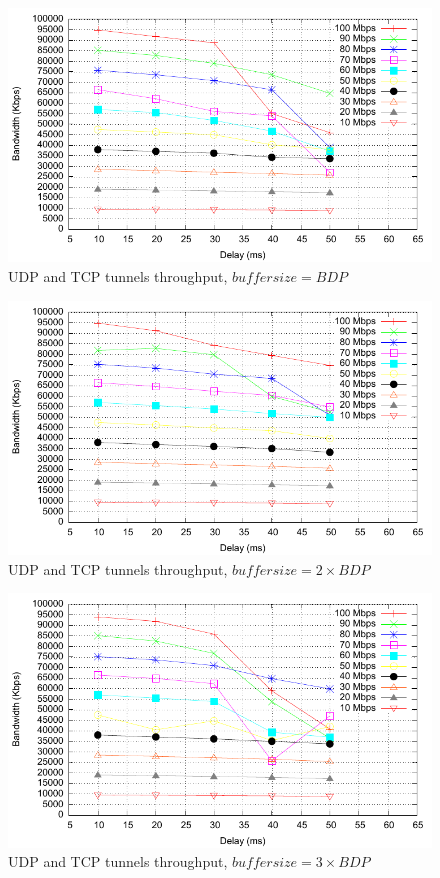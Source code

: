 \begin{figure}
  \centering
  \includegraphics[width=\textwidth]{img/test-mptcp}
  \caption{UDP and TCP tunnels throughput, $buffer size = BDP$}
  \label{fig:mptcp}
\end{figure}

\begin{figure}
  \centering
  \includegraphics[width=\textwidth]{img/test-mptcp-2}
  \caption{UDP and TCP tunnels throughput, $buffer size = 2 \times BDP$}
  \label{fig:mptcp-2}
\end{figure}

\begin{figure}
  \centering
  \includegraphics[width=\textwidth]{img/test-mptcp-3}
  \caption{UDP and TCP tunnels throughput, $buffer size = 3 \times BDP$}
  \label{fig:mptcp-3}
\end{figure}

